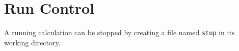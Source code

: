 \documentclass[10pt,leqno, oneside]{book}
\begin{document}
\section{Run Control}
A running calculation can be stopped by creating a file named \verb#stop# in its working directory.  

\end{document}
